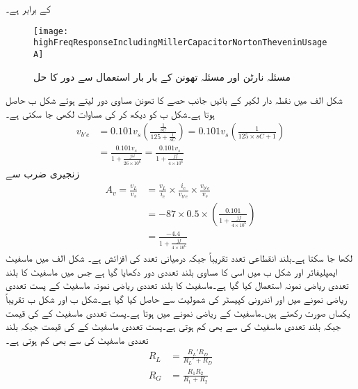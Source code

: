 کے برابر ہے۔
\begin{figure}
\centering
\texttt{[image: highFreqResponseIncludingMillerCapacitorNortonTheveninUsageA]}
\caption{مسئلہ نارٹن اور مسئلہ تھونن کے بار بار استعمال سے دور کا حل}
\label{شکل_تعددی_ردعمل_ماسفیٹ_مشترکہ_مخارج_نارٹن_تھونن_بار_بار_الف}
\end{figure}
شکل  الف میں نقطہ دار لکیر کے بائیں جانب حصے کا تھونن مساوی دور لیتے ہوئے شکل  ب حاصل ہوتا ہے۔شکل  ب کو دیکھ کر  کی مساوات لکھی جا سکتی ہے۔
\begin{align*}
v_{b'e}&=0.101 v_s \left(\frac{\frac{1}{sC}}{125+\frac{1}{sC}}\right)=0.101 v_s \left(\frac{1}{125 \times s C+1}\right)\\
&=\frac{0.101 v_s }{1+\frac{j \omega}{26 \times 10^6}}=\frac{0.101 v_s }{1+\frac{j f}{4 \times 10^6}}
\end{align*}
زنجیری ضرب سے
\begin{align*}
A_v=\frac{v_L}{v_s}&=\frac{v_L}{i_c} \times \frac{i_c}{v_{b'e}} \times \frac{v_{b'e}}{v_s}\\
&=-87 \times 0.5 \times \left(\frac{0.101}{1+\frac{j f}{4 \times 10^6}}\right)\\
&=\frac{-4.4}{1+\frac{j f}{4 \times 10^6}}
\end{align*}
لکھا جا سکتا ہے۔بلند انقطاعی تعدد تقریباً  جبکہ درمیانی تعدد کی افزائش  ہے۔ 
شکل  الف میں ماسفیٹ ایمپلیفائر اور شکل  ب میں اسی کا مساوی بلند تعددی دور دکھایا گیا ہے جس میں ماسفیٹ کا بلند تعددی ریاضی نمونہ استعمال کیا گیا ہے۔ماسفیٹ کا بلند تعددی ریاضی نمونہ ماسفیٹ کے پست تعددی ریاضی نمونے میں  اور  اندرونی کپیسٹر کی شمولیت سے حاصل کیا گیا ہے۔شکل  ب اور شکل  ب  تقریباً یکساں صورت رکھتے ہیں۔ماسفیٹ کے ریاضی نمونے میں   ہوتا ہے۔پست تعددی ماسفیٹ کے  کی قیمت  جبکہ بلند تعددی ماسفیٹ کی  سے بھی کم ہوتی ہے۔پست تعددی ماسفیٹ کے  کی قیمت  جبکہ بلند تعددی ماسفیٹ کی  سے بھی کم ہوتی ہے۔
\begin{align*}
R_L&=\frac{R_L' R_D}{R_L'+R_D}\\
R_G&=\frac{R_1 R_2}{R_1+R_2}
\end{align*}
